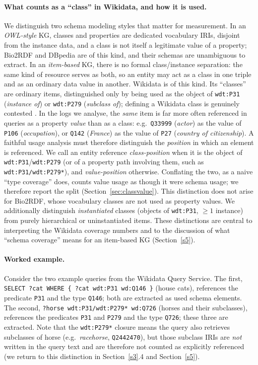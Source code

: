 \documentclass[sw]{iosart2x}
\begin{document}
\paragraph{\textbf{What counts as a ``class'' in Wikidata, and how it is used.}} We distinguish two schema modeling styles that matter for measurement. In an \emph{OWL-style} KG, classes and properties are dedicated vocabulary IRIs, disjoint from the instance data, and a class is not itself a legitimate value of a property; Bio2RDF and DBpedia are of this kind, and their schemas are unambiguous to extract. In an \emph{item-based} KG, there is no formal class/instance separation: the same kind of resource serves as both, so an entity may act as a class in one triple and as an ordinary data value in another. Wikidata is of this kind. Its ``classes'' are ordinary items, distinguished only by being used as the object of \texttt{wdt:P31} (\emph{instance of}) or \texttt{wdt:P279} (\emph{subclass of}); defining a Wikidata class is genuinely contested \cite{brasileiro2016applying,piscopo2018who,patelschneider2024class}. In the logs we analyse, the \emph{same} item is far more often referenced in queries as a property \emph{value} than as a class: e.g.\ \texttt{Q33999} (\emph{actor}) as the value of \texttt{P106} (\emph{occupation}), or \texttt{Q142} (\emph{France}) as the value of \texttt{P27} (\emph{country of citizenship}). A faithful usage analysis must therefore distinguish the \emph{position} in which an element is referenced. We call an entity reference \emph{class-position} when it is the object of \texttt{wdt:P31}/\texttt{wdt:P279} (or of a property path involving them, such as \texttt{wdt:P31/wdt:P279*}), and \emph{value-position} otherwise. Conflating the two, as a naive ``type coverage'' does, counts value usage as though it were schema usage; we therefore report the split (Section~\ref{sec:classvalue}). This distinction does not arise for Bio2RDF, whose vocabulary classes are not used as property values. We additionally distinguish \emph{instantiated} classes (objects of \texttt{wdt:P31}, $\geq 1$ instance) from purely hierarchical or uninstantiated items. These distinctions are central to interpreting the Wikidata coverage numbers and to the discussion of what ``schema coverage'' means for an item-based KG (Section~\ref{s5}).

\paragraph{\textbf{Worked example.}} Consider the two example queries from the Wikidata Query Service. The first, \texttt{SELECT ?cat WHERE \{ ?cat wdt:P31 wd:Q146 \}} (house cats), references the predicate \texttt{P31} and the type \texttt{Q146}; both are extracted as used schema elements. The second, \texttt{?horse wdt:P31/wdt:P279* wd:Q726} (horses and their subclasses), references the predicates \texttt{P31} and \texttt{P279} and the type \texttt{Q726}; these three are extracted. Note that the \texttt{wdt:P279*} closure means the query also retrieves subclasses of horse (e.g.\ \emph{racehorse}, \texttt{Q2442470}), but those subclass IRIs are \emph{not} written in the query text and are therefore not counted as explicitly referenced (we return to this distinction in Section~\ref{s3}.4 and Section~\ref{s5}).
\end{document}
